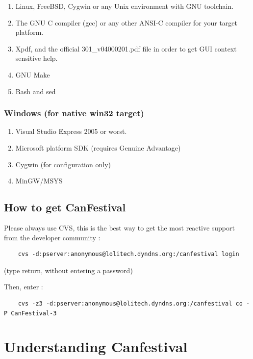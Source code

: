 \documentclass[12pt,english,a4paper]{book}
\begin{document}
\begin{enumerate}
\item Linux, FreeBSD, Cygwin or any Unix environment with GNU toolchain. 
\item The GNU C compiler (gcc) or any other ANSI-C compiler for your target
platform. 
\item Xpdf, and the official 301\_v04000201.pdf file in order to get GUI
context sensitive help. 
\item GNU Make 
\item Bash and sed 
\end{enumerate}

\subsubsection{Windows (for native win32 target)}

\begin{enumerate}
\item Visual Studio Express 2005 or worst.
\item Microsoft platform SDK (requires Genuine Advantage)
\item Cygwin (for configuration only)
\item MinGW/MSYS
\end{enumerate}

\subsection{How to get CanFestival}

Please always use CVS, this is the best way to get the most reactive
support from the developer community :


\begin{verbatim}
	cvs -d:pserver:anonymous@lolitech.dyndns.org:/canfestival login
\end{verbatim}

(type return, without entering a password)

Then, enter :

\begin{verbatim}
	cvs -z3 -d:pserver:anonymous@lolitech.dyndns.org:/canfestival co -P CanFestival-3
\end{verbatim}



\section{Understanding Canfestival}
\end{document}
